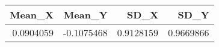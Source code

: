 \begin{table}[!h]
\centering
\begin{tabular}{rrrr}
\toprule
Mean\_X & Mean\_Y & SD\_X & SD\_Y\\
\midrule
0.0904059 & -0.1075468 & 0.9128159 & 0.9669866\\
\bottomrule
\end{tabular}
\end{table}
